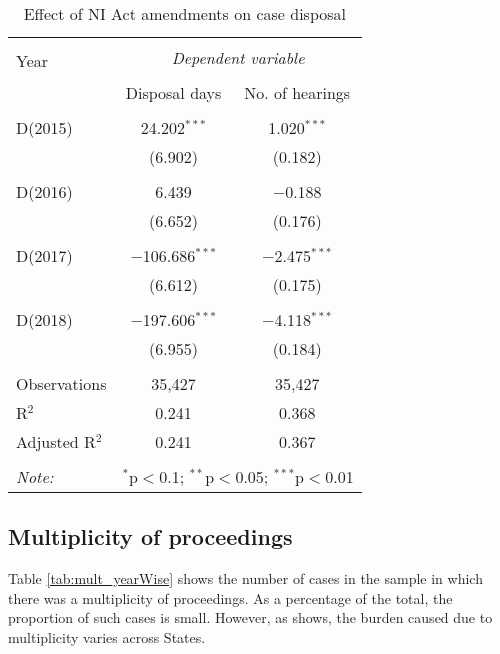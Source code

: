 \begin{table}
 \centering
 \caption{Effect of NI Act amendments on case
 disposal}\label{tab:amendments_effect}
 \footnotesize
 \begin{tabular}{@{\extracolsep{5pt}}lcc}
 \\[-1.8ex] 
 \hline \\[-1.8ex] 
 \multirow{2}{*}{Year} & \multicolumn{2}{c}{\textit{Dependent variable}} \\ 
 \cline{2-3} 
 \\[-1.8ex] & Disposal days & No. of hearings \\ 
 \hline \\[-1.8ex] 
 D(2015) & 24.202$^{***}$ & 1.020$^{***}$ \\ 
 & (6.902) & (0.182) \\ 
 & & \\ 
 D(2016) & 6.439 & $-$0.188 \\ 
 & (6.652) & (0.176) \\ 
 & & \\ 
 D(2017) & $-$106.686$^{***}$ & $-$2.475$^{***}$ \\ 
 & (6.612) & (0.175) \\ 
 & & \\ 
 D(2018) & $-$197.606$^{***}$ & $-$4.118$^{***}$ \\ 
 & (6.955) & (0.184) \\
 \hline \\[-1.8ex] 
 Observations & 35,427 & 35,427 \\ 
 R$^{2}$ & 0.241 & 0.368 \\ 
 Adjusted R$^{2}$ & 0.241 & 0.367 \\ 
 \hline \\[-1.8ex] 
 \textit{Note:} & \multicolumn{2}{r}{$^{*}$p$<$0.1; $^{**}$p$<$0.05; $^{***}$p$<$0.01} \\ 
 \end{tabular} 
\end{table}

\subsection{Multiplicity of proceedings}
\label{sec:mult-proc}

Table \ref{tab:mult_yearWise} shows the number of cases in the sample in which there was a multiplicity of proceedings. As a percentage of the total, the proportion of such cases is small. However, as  shows, the burden caused due to multiplicity varies across States.


